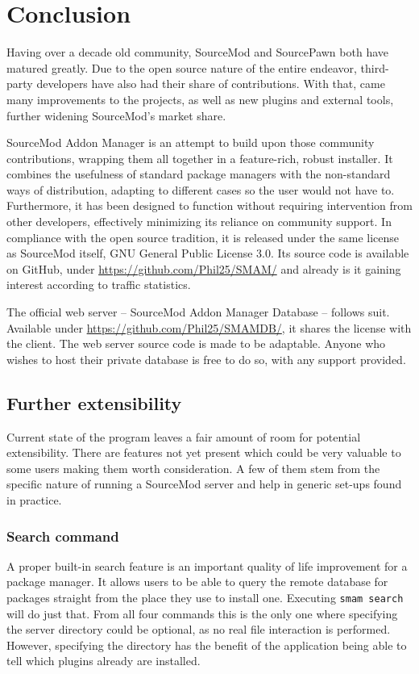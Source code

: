 \chapter{Conclusion}

Having over a decade old community, SourceMod and SourcePawn both have matured greatly.
Due to the open source nature of the entire endeavor, third-party developers have also had their share of contributions.
With that, came many improvements to the projects, as well as new plugins and external tools, further widening SourceMod's market share.

SourceMod Addon Manager is an attempt to build upon those community contributions, wrapping them all together in a feature-rich, robust installer.
It combines the usefulness of standard package managers with the non-standard ways of distribution, adapting to different cases so the user would not have to.
Furthermore, it has been designed to function without requiring intervention from other developers, effectively minimizing its reliance on community support.
In compliance with the open source tradition, it is released under the same license as SourceMod itself, GNU General Public License 3.0.
Its source code is available on GitHub, under \url{https://github.com/Phil25/SMAM/} and already is it gaining interest according to traffic statistics.

The official web server -- SourceMod Addon Manager Database -- follows suit.
Available under \url{https://github.com/Phil25/SMAMDB/}, it shares the license with the client.
The web server source code is made to be adaptable.
Anyone who wishes to host their private database is free to do so, with any support provided.

\section{Further extensibility}

Current state of the program leaves a fair amount of room for potential extensibility.
There are features not yet present which could be very valuable to some users making them worth consideration.
A few of them stem from the specific nature of running a SourceMod server and help in generic set-ups found in practice.

\subsection{Search command}

A proper built-in search feature is an important quality of life improvement for a package manager.
It allows users to be able to query the remote database for packages straight from the place they use to install one.
Executing \verb|smam search| will do just that.
From all four commands this is the only one where specifying the server directory could be optional, as no real file interaction is performed.
However, specifying the directory has the benefit of the application being able to tell which plugins already are installed.

